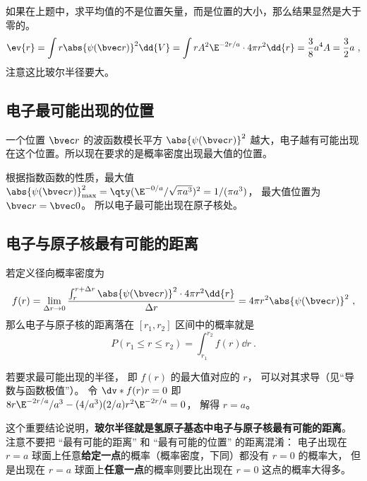 如果在上题中，求平均值的不是位置矢量，而是位置的大小，那么结果显然是大于零的。
\begin{equation}
\ev{r} = \int r \abs{\psi (\bvec r)}^2 \dd{V} = \int r A^2 \E^{-2r/a} \cdot 4\pi r^2 \dd{r} = \frac{3}{8} a^4 A = \frac{3}{2}a~,
\end{equation}
注意这比玻尔半径要大。

\subsection{电子最可能出现的位置}

一个位置 $\bvec r$ 的波函数模长平方 $\abs{\psi(\bvec r)}^2$ 越大，电子越有可能出现在这个位置。所以现在要求的是概率密度出现最大值的位置。
 
根据指数函数的性质，最大值 $\abs{\psi (\bvec r)}_{\max}^2 = \qty( \E^{-0/a}/\sqrt{\pi a^3})^2 = 1/(\pi a^3)$， 最大值位置为 $\bvec r = \bvec 0$。 所以电子最可能出现在原子核处。

\subsection{电子与原子核最有可能的距离}
若定义径向概率密度为
\begin{equation}\label{eq_HWF0_1}
f(r) = \lim_{\Delta r \to 0} \frac{\int_r^{r + \Delta r} {\abs{\psi (\bvec r)}}^2 \cdot 4\pi r^2 \dd{r} }{\Delta r} = 4\pi r^2 \abs{\psi(\bvec r)}^2~,
\end{equation}
那么电子与原子核的距离落在 $[r_1, r_2]$ 区间中的概率就是
\begin{equation}
P(r_1 \le r \le r_2) = \int_{r_1}^{r_2} f(r) \dd{r}~.
\end{equation}

若要求最可能出现的半径， 即 $f(r)$ 的最大值对应的 $r$， 可以对其求导（见“导数与函数极值”）。 令 $\dv*{f(r)}{r} = 0$ 即 $8 r \E^{-2r/a}/a^3 - (4/a^3)(2/a)r^2 \E^{-2r/a} = 0$， 解得 $r = a$。 
 
这个重要结论说明，\textbf{玻尔半径就是氢原子基态中电子与原子核最有可能的距离}。 注意不要把 “最有可能的距离” 和 “最有可能的位置” 的距离混淆： 电子出现在 $r = a$ 球面上任意\textbf{给定一点}的概率（概率密度，下同）都没有 $r = 0$ 的概率大， 但是出现在 $r = a$ 球面上\textbf{任意一点}的概率则要比出现在 $r = 0$ 这点的概率大得多。

